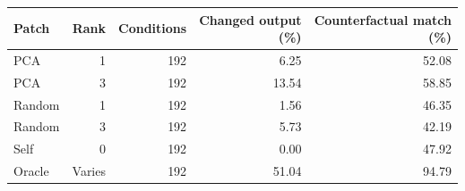 \begin{center}\small
\begin{tabular}{@{}lrrrr@{}}
\toprule
Patch & Rank & Conditions & \shortstack{Changed output\\(\%)} & \shortstack{Counterfactual match\\(\%)} \\
\midrule
PCA & 1 & 192 & 6.25 & 52.08 \\
PCA & 3 & 192 & 13.54 & 58.85 \\
Random & 1 & 192 & 1.56 & 46.35 \\
Random & 3 & 192 & 5.73 & 42.19 \\
Self & 0 & 192 & 0.00 & 47.92 \\
Oracle & Varies & 192 & 51.04 & 94.79 \\
\bottomrule
\end{tabular}
\end{center}
